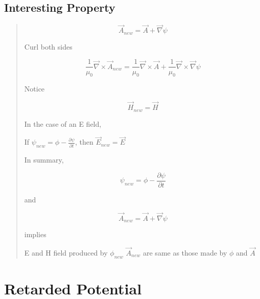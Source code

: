 \documentclass{article} %
\begin{document}
\subsection{Interesting Property}
\begin{quote}
    \[\vec{A}_{new} = \vec{A} + \vec{\nabla}\psi\]

    Curl both sides

    \[\frac{1}{\mu_0}\vec{\nabla} \times \vec{A}_{new} = \frac{1}{\mu_0}\vec{\nabla} \times \vec{A} + \frac{1}{\mu_0}\vec{\nabla} \times \vec{\nabla}\psi\]

    Notice

    \[\vec{H}_{new} = \vec{H}\]

    In the case of an E field,

    If $\psi_{new} = \phi - \frac{\partial \psi}{\partial t}$, then $\vec{E}_{new} = \vec{E}$

    \bigskip
    In summary,

    \[\psi_{new} = \phi - \frac{\partial \psi}{\partial t}\]

    and

    \[\vec{A}_{new} = \vec{A} + \vec{\nabla}\psi\]

    implies

    E and H field produced by $\phi_{new}$ $\vec{A}_{new}$ are same as those made by $\phi$ and $\vec{A}$
\end{quote}


\section{Retarded Potential}
\end{document}
